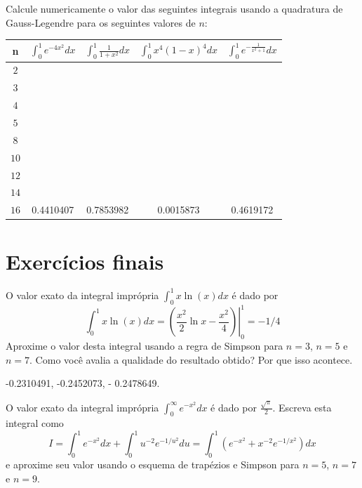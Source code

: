 \begin{Exercise}Calcule numericamente o valor das seguintes integrais usando a quadratura de Gauss-Legendre para os seguintes valores de $n$:
\begin{center}
\begin{tabular}{|c|c|c|c|c|}
\hline
n   & $\int_{0}^1e^{-4x^2}dx$ & $\int_{0}^1\frac{1}{1+x^2}dx$ & $\int_{0}^1x^4(1-x)^4dx$ & $\int_{0}^1e^{-\frac{1}{x^2+1}}dx$  \\
\hline
$2$ & ~\hspace{40pt}~& & ~\hspace{40pt}~& ~\hspace{40pt}~\\
\hline
$3$ && && \\
\hline
$4 $  & &      & & \\
\hline
$5 $  & &      & & \\
\hline
$8 $  & &   & &\\
\hline
$10$   & &  & &\\
\hline
$12$   & &  & &\\
\hline
$14$   & & & &\\
\hline
$16$   &0.4410407  &0.7853982 &0.0015873 & 0.4619172 \\
\hline
\end{tabular}
\end{center}
\end{Exercise}

\section{Exercícios finais}

\begin{Exercise} O valor exato da integral imprópria $\int_0^1x\ln(x)dx$ é dado por
$$\int_0^1x\ln(x)dx=\left.\left(\frac{x^2}{2}\ln x-\frac{x^2}{4}\right)\right|_0^1=-1/4$$
Aproxime o valor desta integral usando a regra  de Simpson para $n=3$, $n=5$ e $n=7$. Como você avalia a qualidade do resultado obtido? Por que isso acontece.
\end{Exercise}


\begin{Answer}
  \begin{tiny}
-0.2310491, -0.2452073, - 0.2478649.    
  \end{tiny}
\end{Answer}


\begin{Exercise} O valor exato da integral imprópria $\int_0^\infty e^{-x^2}dx$ é dado por $\frac{\sqrt{\pi}}{2}$.
Escreva esta integral como
$$I=\int_0^1 e^{-x^2}dx+\int_0^1 u^{-2} e^{-1/u^2}du=\int_0^1 \left(e^{-x^2}+x^{-2}e^{-1/x^2}\right)dx$$
e aproxime seu valor usando o esquema de trapézios e Simpson para $n=5$, $n=7$ e $n=9$.
\end{Exercise}

